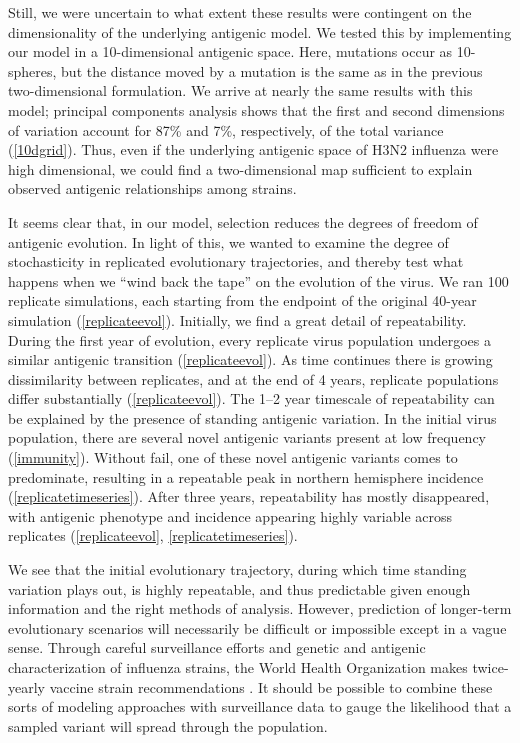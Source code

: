 Still, we were uncertain to what extent these results were contingent on the dimensionality of the underlying antigenic model.  We tested this by implementing our model in a 10-dimensional antigenic space.  Here, mutations occur as 10-spheres, but the distance moved by a mutation is the same as in the previous two-dimensional formulation.  We arrive at nearly the same results with this model; principal components analysis shows that the first and second dimensions of variation account for 87\% and 7\%, respectively, of the total variance (\ref{10dgrid}).  Thus, even if the underlying antigenic space of H3N2 influenza were high dimensional, we could find a two-dimensional map sufficient to explain observed antigenic relationships among strains.

It seems clear that, in our model, selection reduces the degrees of freedom of antigenic evolution.  In light of this, we wanted to examine the degree of stochasticity in replicated evolutionary trajectories, and thereby test what happens when we ``wind back the tape'' \cite{GouldWonderfulLife} on the evolution of the virus.  We ran 100 replicate simulations, each starting from the endpoint of the original 40-year simulation (\ref{replicateevol}).  Initially, we find a great detail of repeatability.  During the first year of evolution, every replicate virus population undergoes a similar antigenic transition (\ref{replicateevol}).  As time continues there is growing dissimilarity between replicates, and at the end of 4 years, replicate populations differ substantially (\ref{replicateevol}).  The 1--2 year timescale of repeatability can be explained by the presence of standing antigenic variation.  In the initial virus population, there are several novel antigenic variants present at low frequency (\ref{immunity}).  Without fail, one of these novel antigenic variants comes to predominate, resulting in a repeatable peak in northern hemisphere incidence (\ref{replicatetimeseries}).  After three years, repeatability has mostly disappeared, with antigenic phenotype and incidence appearing highly variable across replicates (\ref{replicateevol}, \ref{replicatetimeseries}).

We see that the initial evolutionary trajectory, during which time standing variation plays out, is highly repeatable, and thus predictable given enough information and the right methods of analysis.  However, prediction of longer-term evolutionary scenarios will necessarily be difficult or impossible except in a vague sense.  Through careful surveillance efforts and genetic and antigenic characterization of influenza strains, the World Health Organization makes twice-yearly vaccine strain recommendations \cite{Barr10}.  It should be possible to combine these sorts of modeling approaches with surveillance data to gauge the likelihood that a sampled variant will spread through the population.

